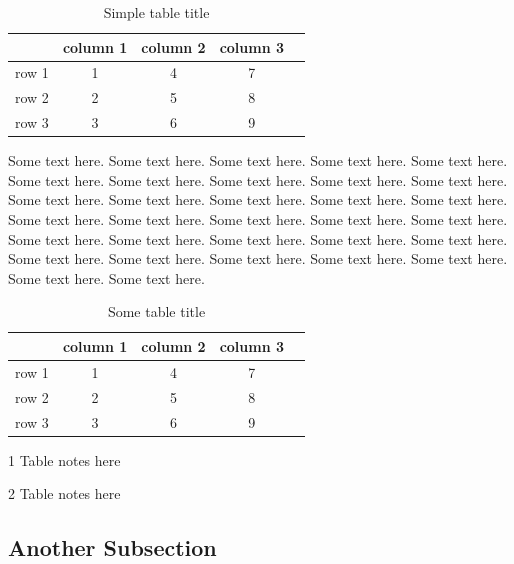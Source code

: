 \documentclass[11pt,twoside]{article}
\theoremstyle{plain}
\theoremstyle{definition}
\theoremstyle{remark}
\begin{document}
\begin{table}[ht]
\centering
\caption{\small{Simple table title}}\label{tab:some_simple_table_label}
\begin{tabular}{lcccc}
  \hline
 & column 1 & column 2 & column 3 \\
  \hline
  row 1 & 1          & 4          & 7 \\
  row 2 & 2          & 5          & 8 \\
  row 3 & 3          & 6          & 9 \\
   \hline
\end{tabular}
\end{table}


Some text here. Some text here. Some text here. Some text here.
Some text here. Some text here. Some text here. Some text here.
Some text here. Some text here. Some text here. Some text here.
Some text here. Some text here. Some text here. Some text here.
Some text here. Some text here. Some text here. Some text here.
Some text here. Some text here. Some text here. Some text here.
Some text here. Some text here. Some text here. Some text here.
Some text here. Some text here. Some text here. Some text here.

\begin{table}[ht]
\centering
\begin{threeparttable}
\caption{\small{Some table title}}\label{tab:some_table_label}
\begin{tabular}{lcccc}
  \hline
 & column 1 & column 2 & column 3 \\
  \hline
  row 1 & 1\tnote{1} & 4          & 7 \\
  row 2 & 2          & 5          & 8 \\
  row 3 & 3          & 6\tnote{2} & 9 \\
   \hline
\end{tabular}
\begin{tablenotes}
\item[1] \footnotesize{Table notes here} \\
\item[2] \footnotesize{Table notes here} \\
\end{tablenotes}
\end{threeparttable}
\end{table}



\subsection{Another Subsection}
\label{sub:another_subsection}
\end{document}
